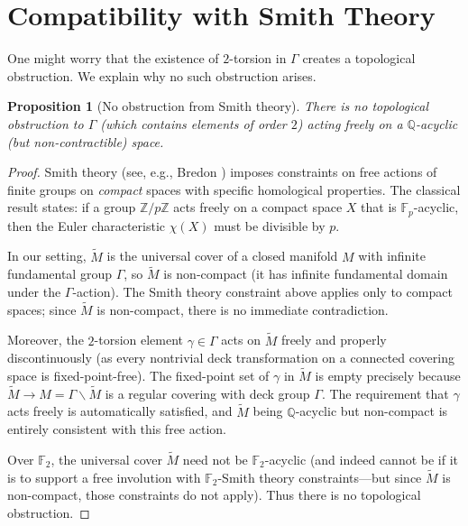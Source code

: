 \documentclass[12pt]{article}
\newtheorem{proposition}[theorem]{Proposition}
\theoremstyle{definition}
\begin{document}
\section{Compatibility with Smith Theory}

One might worry that the existence of $2$-torsion in $\Gamma$ creates a topological
obstruction.  We explain why no such obstruction arises.

\begin{proposition}[No obstruction from Smith theory]\label{prop:smith}
  There is no topological obstruction to $\Gamma$ (which contains elements of order $2$)
  acting freely on a $\mathbb{Q}$-acyclic (but non-contractible) space.
\end{proposition}

\begin{proof}
Smith theory (see, e.g., Bredon \cite{Bredon1972}) imposes constraints on free actions of
finite groups on \emph{compact} spaces with specific homological properties.  The classical
result states: if a group $\mathbb{Z}/p\mathbb{Z}$ acts freely on a compact space $X$ that
is $\mathbb{F}_p$-acyclic, then the Euler characteristic $\chi(X)$ must be divisible by $p$.

In our setting, $\widetilde{M}$ is the universal cover of a closed manifold $M$ with
infinite fundamental group $\Gamma$, so $\widetilde{M}$ is non-compact (it has infinite
fundamental domain under the $\Gamma$-action).  The Smith theory constraint above applies
only to compact spaces; since $\widetilde{M}$ is non-compact, there is no immediate
contradiction.

Moreover, the $2$-torsion element $\gamma \in \Gamma$ acts on $\widetilde{M}$ freely
and properly discontinuously (as every nontrivial deck transformation on a connected
covering space is fixed-point-free).  The fixed-point set of $\gamma$ in $\widetilde{M}$
is empty precisely because $\widetilde{M} \to M = \Gamma \backslash \widetilde{M}$ is a
regular covering with deck group $\Gamma$.  The requirement that $\gamma$ acts freely is
automatically satisfied, and $\widetilde{M}$ being $\mathbb{Q}$-acyclic but non-compact
is entirely consistent with this free action.

Over $\mathbb{F}_2$, the universal cover $\widetilde{M}$ need not be $\mathbb{F}_2$-acyclic
(and indeed cannot be if it is to support a free involution with $\mathbb{F}_2$-Smith theory
constraints---but since $\widetilde{M}$ is non-compact, those constraints do not apply).
Thus there is no topological obstruction.
\end{proof}
\end{document}
